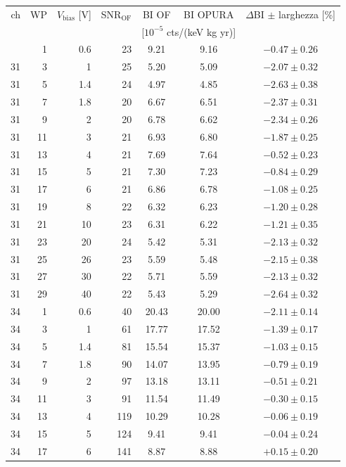 \documentclass[11pt,a4paper]{article}
\begin{document}
{\small
\begin{longtable}{rrrrccc}
\toprule
ch & WP & $V_\text{bias}$ [V] & SNR$_\mathrm{OF}$ & BI OF & BI OPURA & $\Delta$BI $\pm$ larghezza [\%] \\
   &    &                     &                   & \multicolumn{2}{c}{[$10^{-5}$ cts/(keV kg yr)]} & \\
\midrule
\endhead
\bottomrule
\endfoot
31 & 1 & 0.6 & 23 & 9.21 & 9.16 & $-0.47 \pm 0.26$ \\
31 & 3 & 1 & 25 & 5.20 & 5.09 & $-2.07 \pm 0.32$ \\
31 & 5 & 1.4 & 24 & 4.97 & 4.85 & $-2.63 \pm 0.38$ \\
31 & 7 & 1.8 & 20 & 6.67 & 6.51 & $-2.37 \pm 0.31$ \\
31 & 9 & 2 & 20 & 6.78 & 6.62 & $-2.34 \pm 0.26$ \\
31 & 11 & 3 & 21 & 6.93 & 6.80 & $-1.87 \pm 0.25$ \\
31 & 13 & 4 & 21 & 7.69 & 7.64 & $-0.52 \pm 0.23$ \\
31 & 15 & 5 & 21 & 7.30 & 7.23 & $-0.84 \pm 0.29$ \\
31 & 17 & 6 & 21 & 6.86 & 6.78 & $-1.08 \pm 0.25$ \\
31 & 19 & 8 & 22 & 6.32 & 6.23 & $-1.20 \pm 0.28$ \\
31 & 21 & 10 & 23 & 6.31 & 6.22 & $-1.21 \pm 0.35$ \\
31 & 23 & 20 & 24 & 5.42 & 5.31 & $-2.13 \pm 0.32$ \\
31 & 25 & 26 & 23 & 5.59 & 5.48 & $-2.15 \pm 0.38$ \\
31 & 27 & 30 & 22 & 5.71 & 5.59 & $-2.13 \pm 0.32$ \\
31 & 29 & 40 & 22 & 5.43 & 5.29 & $-2.64 \pm 0.32$ \\
\midrule
34 & 1 & 0.6 & 40 & 20.43 & 20.00 & $-2.11 \pm 0.14$ \\
34 & 3 & 1 & 61 & 17.77 & 17.52 & $-1.39 \pm 0.17$ \\
34 & 5 & 1.4 & 81 & 15.54 & 15.37 & $-1.03 \pm 0.15$ \\
34 & 7 & 1.8 & 90 & 14.07 & 13.95 & $-0.79 \pm 0.19$ \\
34 & 9 & 2 & 97 & 13.18 & 13.11 & $-0.51 \pm 0.21$ \\
34 & 11 & 3 & 91 & 11.54 & 11.49 & $-0.30 \pm 0.15$ \\
34 & 13 & 4 & 119 & 10.29 & 10.28 & $-0.06 \pm 0.19$ \\
34 & 15 & 5 & 124 & 9.41 & 9.41 & $-0.04 \pm 0.24$ \\
34 & 17 & 6 & 141 & 8.87 & 8.88 & $+0.15 \pm 0.20$ \\

\end{longtable}}
\end{document}
